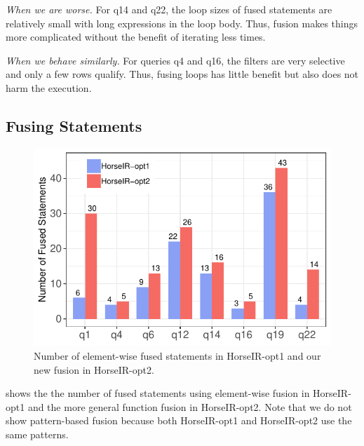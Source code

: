 \textit{When we are worse.}
For q14 and q22, the loop sizes of fused statements are relatively small with
long expressions in the loop body. Thus, fusion makes things more complicated
without the benefit of iterating less times. 

\textit{When we behave similarly.}
For queries q4 and q16, the filters are very selective and only a few rows
qualify. Thus, fusing loops has little benefit but also does not harm the
execution.





\subsection{Fusing Statements}

\begin{figure}[htbp]
\centering
\includegraphics[width=.9\columnwidth]{./src/figure/bar-number.pdf}
\caption{Number of element-wise fused statements in HorseIR-opt1 and our new
fusion in HorseIR-opt2.}
\label{fig:opt_number}
\end{figure}

 shows the the number of fused statements using
element-wise fusion in HorseIR-opt1 and the more general function fusion in
HorseIR-opt2.  Note that we do not show pattern-based fusion because both
HorseIR-opt1 and HorseIR-opt2 use the same patterns. 

